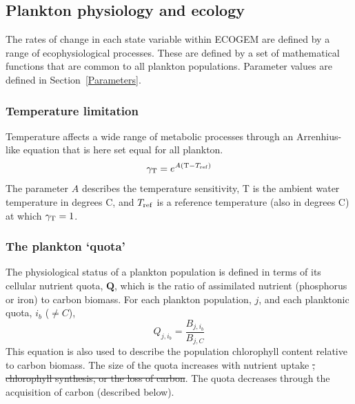 \documentclass[gmd, manuscript]{copernicus}
\newcommand{\matr}[1]{\mathbf{#1}}
\providecommand{\DIFadd}[1]{{\protect\color{blue}\uwave{#1}}} %
\providecommand{\DIFdel}[1]{{\protect\color{red}\sout{#1}}}                      %
\providecommand{\DIFaddbegin}{} %
\providecommand{\DIFaddend}{} %
\providecommand{\DIFdelbegin}{} %
\providecommand{\DIFdelend}{} %
\begin{document}

\subsection{Plankton physiology and ecology}\label{PhysiolProc}

The rates of change in each state variable within ECOGEM are defined by a range of ecophysiological processes. These are defined by a set of mathematical functions that are common to all plankton populations. Parameter values are defined in Section~\ref{Parameters}.


\subsubsection{Temperature limitation}

Temperature affects a wide range of metabolic processes through an Arrenhius-like equation that is here set equal for all plankton.
%
\begin{equation}
\gamma_{\rm T} = e^{A ( {\rm T} - T_{\rm ref} )}
\label{tempfunc}
\end{equation}
%
The parameter $A$ describes the temperature sensitivity, T is the ambient water temperature in degrees C, and $T_{\rm ref}$ is a reference temperature (also in degrees C) at which $\gamma_{\rm T}=1$.


\subsubsection{The plankton `quota'}

The physiological status of a plankton population is defined in terms of its cellular nutrient quota, $\matr{Q}$, which is the ratio of assimilated nutrient (phosphorus or iron) to carbon biomass. For each plankton population, $j$, and each planktonic quota, $i_b$ ($\ne C$), 
%
\begin{equation}
Q_{j,i_b} = \frac{B_{j,i_b}}{B_{j,C}}
\end{equation}
%
This equation is also used to describe the population chlorophyll content relative to carbon biomass. The size of the quota increases with nutrient uptake \DIFdelbegin \DIFdel{, chlorophyll synthesis, or the loss of carbon}\DIFdelend \DIFaddbegin \DIFadd{or chlorophyll synthesis}\DIFaddend . The quota decreases through the acquisition of carbon (described below). 
\end{document}
